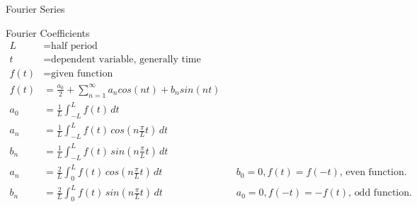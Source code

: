 %
%

\begin{section}{Fourier Series}
  \begin{subsection}{Fourier Coefficients}
    \begin{align*}
      L &= \text{half period}\\
      t &= \text{dependent variable, generally time} \\
      f(t) &= \text{given function}\\
      f(t) &= \frac{a_{0}}{2} + \sum_{n=1}^{\infty} a_ncos(nt) + b_nsin(nt)\\
      a_0 &= \frac{1}{L} \int_{-L}^{L} f(t)\,dt\\
      a_n &= \frac{1}{L} \int_{-L}^{L} f(t)\,cos(n\frac{\pi}{L}t)\,dt \\
      b_n &= \frac{1}{L} \int_{-L}^{L} f(t)\,sin(n\frac{\pi}{L}t)\,dt \\
      a_n &= \frac{2}{L} \int_{0}^{L} f(t)\,cos(n\frac{\pi}{L}t)\,dt
          && b_0=0, f(t)=f(-t),\,\text{even function.} \\
      b_n &= \frac{2}{L} \int_{0}^{L} f(t)\,sin(n\frac{\pi}{L}t)\,dt
          && a_0=0, f(-t)=-f(t),\,\text{odd function.} \\
    \end{align*}
  \end{subsection}
\end{section}
